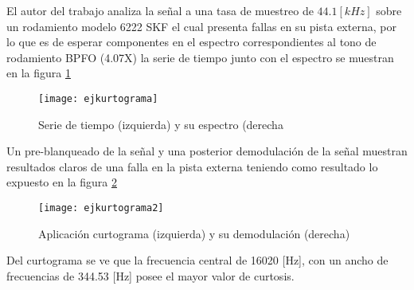     			El autor del trabajo analiza la señal a una tasa de muestreo de $44.1 [kHz]$ sobre un rodamiento modelo 6222 SKF el cual presenta fallas en su pista externa, por lo que es de esperar componentes en el espectro correspondientes al tono de rodamiento BPFO (4.07X)
    			la serie de tiempo junto con el espectro se muestran en la figura \ref{fig:ejkurtograma}
    			\begin{figure}
    			    \centering
    			    \texttt{[image: ejkurtograma]}
    			    \caption{Serie de tiempo (izquierda) y su espectro (derecha}
    			    \label{fig:ejkurtograma}
    			\end{figure}
    			Un pre-blanqueado de la señal y una posterior demodulación de la señal muestran resultados claros de una falla en la pista externa teniendo como resultado lo expuesto en la figura \ref{fig:ejkurtograma2}
    			\begin{figure}[H]
    			    \centering
    			    \texttt{[image: ejkurtograma2]}
    			    \caption{Aplicación curtograma (izquierda) y su demodulación (derecha)}
    			    \label{fig:ejkurtograma2}
    			\end{figure}
    			Del curtograma se ve que la frecuencia central de 16020 [Hz], con un ancho de frecuencias de 344.53 [Hz] posee el mayor valor de curtosis.